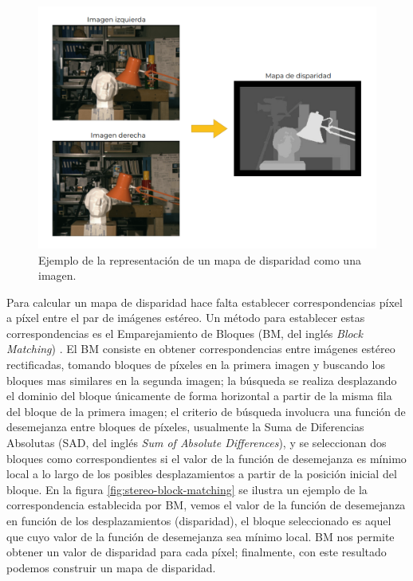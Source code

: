 \begin{figure}[H]
    \centering
    \includegraphics[scale=0.4]{partes/img/disparity-map.png}
    \caption[Ejemplo de la representación de un mapa de disparidad como una imagen.]{Ejemplo de la representación de un mapa de disparidad como una imagen\footnotemark.} 
    \label{fig:stereo-diparity-map}
\end{figure}

Para calcular un mapa de disparidad hace falta establecer correspondencias píxel a píxel entre el par de imágenes estéreo. Un método para establecer estas correspondencias es el Emparejamiento de Bloques (BM, del inglés \textit{Block Matching}) \cite{Baudes2009}. El BM consiste en obtener correspondencias entre imágenes estéreo rectificadas, tomando bloques de píxeles en la primera imagen y buscando los bloques mas similares en la segunda imagen; la búsqueda se realiza desplazando el dominio del bloque únicamente de forma horizontal a partir de la misma fila del bloque de la primera imagen; el criterio de búsqueda involucra una función de desemejanza entre bloques de píxeles, usualmente la Suma de Diferencias Absolutas (SAD, del inglés \textit{Sum of Absolute Differences}), y se seleccionan dos bloques como correspondientes si el valor de la función de desemejanza es mínimo local a lo largo de los posibles desplazamientos a partir de la posición inicial del bloque. En la figura \ref{fig:stereo-block-matching} se ilustra un ejemplo de la correspondencia establecida por BM, vemos el valor de la función de desemejanza en función de los desplazamientos (disparidad), el bloque seleccionado es aquel que cuyo valor de la función de desemejanza sea mínimo local. BM nos permite obtener un valor de disparidad para cada píxel; finalmente, con este resultado podemos construir un mapa de disparidad.


